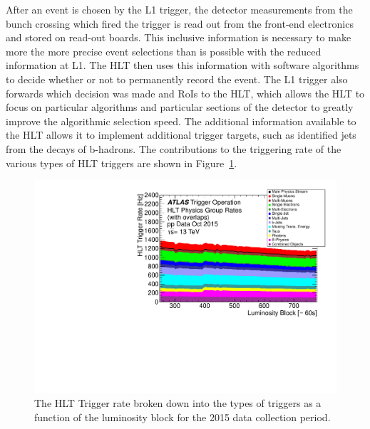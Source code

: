 After an event is chosen by the L1 trigger, the detector measurements from the bunch crossing which fired the trigger is read out from the front-end electronics and stored on read-out boards.
This inclusive information is necessary to make more the more precise event selections than is possible with the reduced information at L1.
The \ac{HLT} then uses this information with software algorithms to decide whether or not to permanently record the event.
The L1 trigger also forwards which decision was made and \acp{RoI} to the \ac{HLT}, which allows the \ac{HLT} to focus on particular algorithms and particular sections of the detector to greatly improve the algorithmic selection speed.
The additional information available to the \ac{HLT} allows it to implement additional trigger targets, such as identified jets from the decays of b-hadrons.
The contributions to the triggering rate of the various types of \ac{HLT} triggers are shown in Figure~\ref{fig:trigger_hltrate}. 

\begin{figure}[hbtp]
\includegraphics[width=\fullfig]{figures/trigger_hltrate.pdf}
\caption{The HLT Trigger rate broken down into the types of triggers as a function of the luminosity block for the 2015 data collection period.}
\label{fig:trigger_hltrate}
\end{figure}

